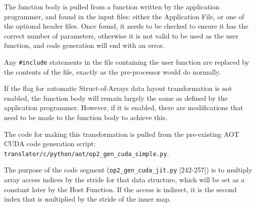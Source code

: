 \noindent The function body is pulled from a function written by the application programmer, and found in the input files: either the Application File, or one of the optional header files. Once found, it needs to be checked to ensure it has the correct number of parameters, otherwise it is not valid to be used as the user function, and code generation will end with an error.
\par
Any \verb|#include| statements in the file containing the user function are replaced by the contents of the file, exactly as the pre-processor would do normally.
\par
{} If the flag for automatic Struct-of-Arrays data layout transformation is not enabled, the function body will remain largely the same as defined by the application programmer. However, if it is enabled, there are modifications that need to be made to the function body to achieve this.
\par The code for making this transformation is pulled from the pre-existing AOT CUDA code generation script: \\\verb|translator/c/python/aot/op2_gen_cuda_simple.py|.
\par
The purpose of the code segment (\verb|op2_gen_cuda_jit.py| [242-257]) is to multiply array access indices by the stride for that data structure, which will be set as a constant later by the Host Function. If the access is indirect, it is the second index that is multiplied by the stride of the inner map.
